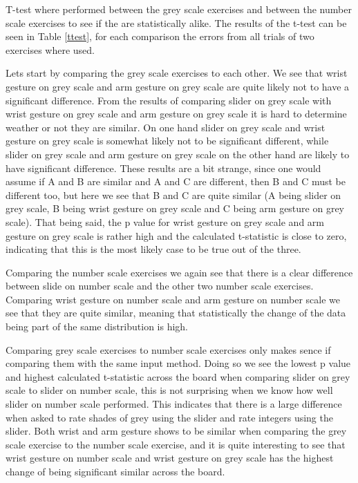 T-test where performed between the grey scale exercises and between the number scale exercises to see if the are statistically alike. The results of the t-test can be seen in Table \ref{ttest}, for each comparison the errors from all trials of two exercises where used.

Lets start by comparing the grey scale exercises to each other. We see that wrist gesture on grey scale and arm gesture on grey scale are quite likely not to have a significant difference. From the results of comparing slider on grey scale with wrist gesture on grey scale and arm gesture on grey scale it is hard to determine weather or not they are similar. On one hand slider on grey scale and wrist gesture on grey scale is somewhat likely not to be significant different, while slider on grey scale and arm gesture on grey scale on the other hand are likely to have significant difference. These results are a bit strange, since one would assume if A and B are similar and A and C are different, then B and C must be different too, but here we see that B and C are quite similar (A being slider on grey scale, B being wrist gesture on grey scale and C being arm gesture on grey scale). That being said, the p value for wrist gesture on grey scale and arm gesture on grey scale is rather high and the calculated t-statistic is close to zero, indicating that this is the most likely case to be true out of the three.

Comparing the number scale exercises we again see that there is a clear difference between slide on number scale and the other two number scale exercises. Comparing wrist gesture on number scale and arm gesture on number scale we see that they are quite similar, meaning that statistically the change of the data being part of the same distribution is high.

Comparing grey scale exercises to number scale exercises only makes sence if comparing them with the same input method. Doing so we see the lowest p value and highest calculated t-statistic across the board when comparing slider on grey scale to slider on number scale, this is not surprising when we know how well slider on number scale performed. This indicates that there is a large difference when asked to rate shades of grey using the slider and rate integers using the slider. Both wrist and arm gesture shows to be similar when comparing the grey scale exercise to the number scale exercise, and it is quite interesting to see that wrist gesture on number scale and wrist gesture on grey scale has the highest change of being significant similar across the board. 



